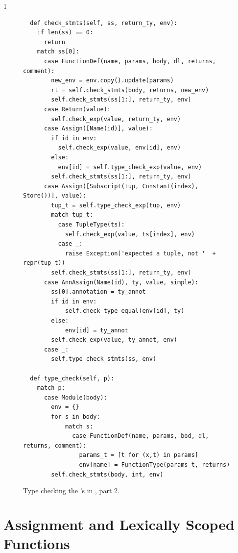 \documentclass[7x10,nocrop]{TimesAPriori_MIT}%
\def\pythonEd{1}
\def\edition{1}
\begin{document}
{\if\edition\pythonEd 
\begin{figure}[tbp]
\begin{lstlisting}
  def check_stmts(self, ss, return_ty, env):
    if len(ss) == 0:
      return
    match ss[0]:
      case FunctionDef(name, params, body, dl, returns, comment):
        new_env = env.copy().update(params)
        rt = self.check_stmts(body, returns, new_env)
        self.check_stmts(ss[1:], return_ty, env)
      case Return(value):
        self.check_exp(value, return_ty, env)
      case Assign([Name(id)], value):
        if id in env:
          self.check_exp(value, env[id], env)
        else:
          env[id] = self.type_check_exp(value, env)
        self.check_stmts(ss[1:], return_ty, env)
      case Assign([Subscript(tup, Constant(index), Store())], value):
        tup_t = self.type_check_exp(tup, env)
        match tup_t:
          case TupleType(ts):
            self.check_exp(value, ts[index], env)
          case _:
            raise Exception('expected a tuple, not '  + repr(tup_t))
        self.check_stmts(ss[1:], return_ty, env)
      case AnnAssign(Name(id), ty, value, simple):
        ss[0].annotation = ty_annot
        if id in env:
            self.check_type_equal(env[id], ty)
        else:
            env[id] = ty_annot
        self.check_exp(value, ty_annot, env)
      case _:
        self.type_check_stmts(ss, env)

  def type_check(self, p):
    match p:
      case Module(body):
        env = {}
        for s in body:
            match s:
              case FunctionDef(name, params, bod, dl, returns, comment):
                params_t = [t for (x,t) in params]
                env[name] = FunctionType(params_t, returns)
        self.check_stmts(body, int, env)
\end{lstlisting}
\caption{Type checking the 's in \LangLam{}, part 2.}
\label{fig:type-check-Llambda-part2}
\end{figure}
\fi}

\clearpage

\section{Assignment and Lexically Scoped Functions}
\label{sec:assignment-scoping}
\end{document}
